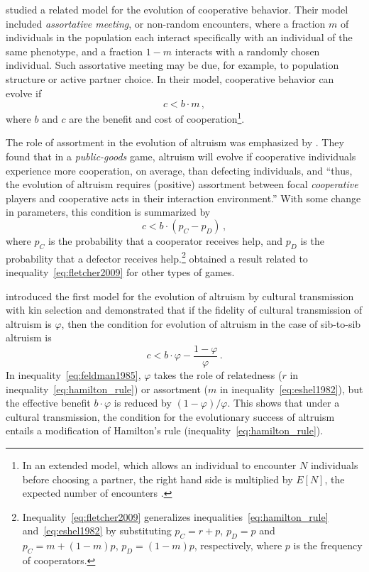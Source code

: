 \documentclass[12pt]{extarticle}
\begin{document}
\citet{Eshel1982} studied a related model for the evolution of cooperative behavior.
Their model included \emph{assortative meeting}, or non-random encounters, where a fraction $m$ of individuals in the population each interact specifically with an individual of the same phenotype, and a fraction $1-m$ interacts  with a randomly chosen individual.  
Such assortative meeting may be due, for example, to population structure or active partner choice.
In their model, cooperative behavior can evolve if
\citep[eq.~3.2]{Eshel1982}
\begin{equation} \label{eq:eshel1982}
c < b \cdot m \,,
\end{equation}
where $b$ and $c$ are the benefit and cost of cooperation\footnote{In an extended model, which allows an individual to encounter $N$ individuals before choosing a partner, the right hand side is multiplied by $E[N]$, the expected number of encounters \citep[eq.~4.6]{Eshel1982}.
}. 

The role of assortment in the evolution of altruism was emphasized by \citet{Fletcher2009assortment}.
They found that in a \emph{public-goods} game, altruism will evolve if cooperative individuals experience more cooperation, on average, than defecting individuals, and ``thus, the evolution of altruism requires (positive) assortment between focal \emph{cooperative} players and cooperative acts in their interaction environment.''
With some change in parameters, this condition is summarized by \citep[eq.~2.3]{Fletcher2009assortment}
\begin{equation} \label{eq:fletcher2009}
c < b \cdot (p_C - p_D ) \,,
\end{equation}
where $p_C$ is the probability that a cooperator receives help, and $p_D$ is the probability that a defector receives help.\footnote{Inequality~\ref{eq:fletcher2009} generalizes inequalities~\ref{eq:hamilton_rule} and~\ref{eq:eshel1982} by substituting $p_C=r + p$, $p_D=p$ and $p_C=m + (1-m)p$, $p_D=(1-m)p$, respectively, where $p$ is the frequency of cooperators.}
\citet{Bijma2010assortment} obtained a result related to inequality~\ref{eq:fletcher2009} for other types of games.


\citet{feldman1985gene} introduced the first model for the evolution of altruism by cultural transmission with kin selection and demonstrated that if the fidelity of cultural transmission of altruism is $\varphi$, then the condition for evolution of altruism in the case of sib-to-sib altruism is \citep[Eq.~16]{feldman1985gene}
\begin{equation} \label{eq:feldman1985}
c < b \cdot \varphi - \frac{1-\varphi}{\varphi} \,.
\end{equation}
In inequality~\ref{eq:feldman1985}, $\varphi$ takes the role of relatedness ($r$ in inequality~\ref{eq:hamilton_rule}) or assortment ($m$ in inequality~\ref{eq:eshel1982}), but the effective benefit $b\cdot \varphi$ is  reduced by $(1-\varphi)/\varphi$.
This shows that under a cultural transmission, the condition for the evolutionary success of altruism entails a modification of Hamilton's rule (inequality~\ref{eq:hamilton_rule}).
\end{document}
